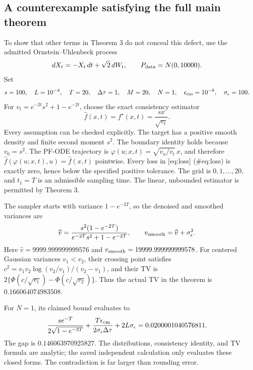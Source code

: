 \documentclass[10pt]{article}
\begin{document}
\subsection*{A counterexample satisfying the full main theorem}
To show that other terms in Theorem 3 do not conceal this defect, use the admitted Ornstein–Uhlenbeck process \[dX_t=-X_t\,dt+\sqrt2\,dW_t,\qquad P_{\rm data}=N(0,10000).\] Set \[s=100,\quad L=10^{-4},\quad T=20,\quad
\Delta\tau=1,\quad M=20,\quad N=1,\quad
\epsilon_{\rm cm}=10^{-8},\quad \sigma_\epsilon=100.\] For \(v_t=e^{-2t}s^2+1-e^{-2t}\), choose the exact consistency estimator \[\widehat f(x,t)=f^\star(x,t)=\frac{sx}{\sqrt{v_t}}.\] Every assumption can be checked explicitly. The target has a positive smooth density and finite second moment \(s^2\). The boundary identity holds because \(v_0=s^2\). The PF-ODE trajectory is \(\varphi(u;x,t)=\sqrt{v_u/v_t}\,x\), and therefore \(\widehat f(\varphi(u;x,t),u)=\widehat f(x,t)\) pointwise. Every loss in [eq:loss] (\#eq:loss) is exactly zero, hence below the specified positive tolerance. The grid is \(0,1,\ldots,20\), and \(t_1=T\) is an admissible sampling time. The linear, unbounded estimator is permitted by Theorem 3.\par
The sampler starts with variance \(1-e^{-2T}\), so the denoised and smoothed variances are \[\widehat v=\frac{s^2(1-e^{-2T})}{e^{-2T}s^2+1-e^{-2T}},
\qquad v_{\rm smooth}=\widehat v+\sigma_\epsilon^2.\] Here \(\widehat v=9999.999999999576\) and \(v_{\rm smooth}=19999.999999999578\). For centered Gaussian variances \(v_1<v_2\), their crossing point satisfies \(c^2=v_1v_2\log(v_2/v_1)/(v_2-v_1)\), and their TV is \(2\{\Phi(c/\sqrt{v_1})-\Phi(c/\sqrt{v_2})\}\). Thus the actual TV in the theorem is \(0.166064074983508\).\par
For \(N=1\), its claimed bound evaluates to \[\frac{s e^{-T}}{2\sqrt{1-e^{-2T}}}
+\frac{T\epsilon_{\rm cm}}{2\sigma_\epsilon\Delta\tau}
+2L\sigma_\epsilon
=0.0200001040576811.\] The gap is \(0.146063970925827\). The distributions, consistency identity, and TV formula are analytic; the saved independent calculation only evaluates these closed forms. The contradiction is far larger than rounding error.\par
\end{document}
